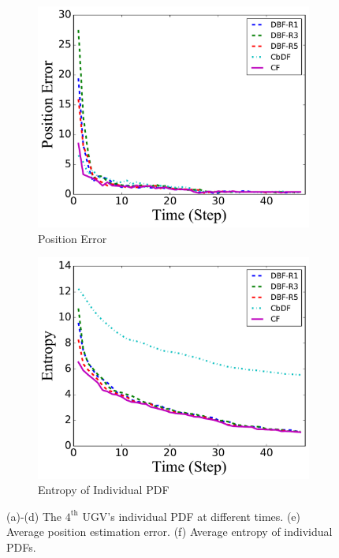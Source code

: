 \documentclass[journal]{IEEEtranTIE}
\theoremstyle{remark}
\begin{document}
\begin{figure}
\begin{subfigure}[b]{0.23\textwidth}
		\includegraphics[width=\textwidth]{figures/hetero_mov_sen_mov_tar_pos_err}
		\caption{Position Error}\label{fig:htr_mov_sen_mov_tar_pos_err}
	\end{subfigure}
	\begin{subfigure}[b]{0.23\textwidth}
		\includegraphics[width=\textwidth]{figures/hetero_mov_sen_mov_tar_entropy}
		\caption{Entropy of Individual PDF}\label{fig:htr_mov_sen_mov_tar_entropy}
	\end{subfigure}
	\caption{(a)-(d) The $4^\text{th}$ UGV's individual PDF at different times. (e) Average position estimation error. (f) Average entropy of individual PDFs.}
\end{figure}
\end{document}
